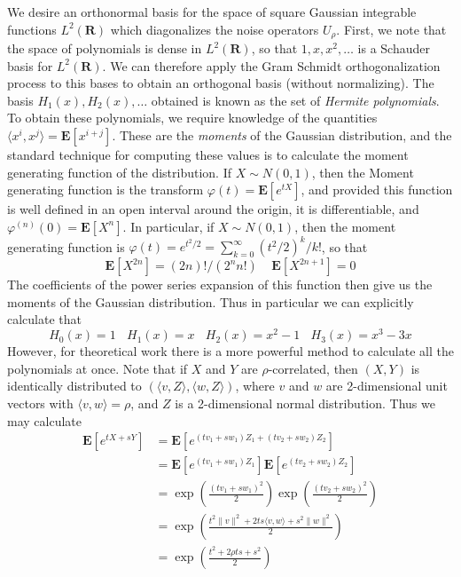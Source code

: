 We desire an orthonormal basis for the space of square Gaussian integrable functions $L^2(\mathbf{R})$ which diagonalizes the noise operators $U_\rho$. First, we note that the space of polynomials is dense in $L^2(\mathbf{R})$, so that $1, x, x^2, \dots$ is a Schauder basis for $L^2(\mathbf{R})$. We can therefore apply the Gram Schmidt orthogonalization process to this bases to obtain an orthogonal basis (without normalizing). The basis $H_1(x), H_2(x), \dots$ obtained is known as the set of \emph{Hermite polynomials}. To obtain these polynomials, we require knowledge of the quantities $\langle x^i, x^j \rangle = \mathbf{E}[x^{i+j}]$. These are the {\it moments} of the Gaussian distribution, and the standard technique for computing these values is to calculate the moment generating function of the distribution. If $X \sim N(0,1)$, then the Moment generating function is the transform $\varphi(t) = \mathbf{E}[e^{tX}]$, and provided this function is well defined in an open interval around the origin, it is differentiable, and $\varphi^{(n)}(0) = \mathbf{E}[X^n]$. In particular, if $X \sim N(0,1)$, then the moment generating function is $\varphi(t) = e^{t^2/2} = \sum_{k = 0}^\infty (t^2/2)^k/k!$, so that
%
\[ \mathbf{E}[X^{2n}] = (2n)!/(2^n n!) \ \ \ \ \ \mathbf{E}[X^{2n+1}] = 0 \]
%
The coefficients of the power series expansion of this function then give us the moments of the Gaussian distribution. Thus in particular we can explicitly calculate that
%
\[ H_0(x) = 1\ \ \ \ H_1(x) = x\ \ \ \ H_2(x) = x^2 - 1\ \ \ \ H_3(x) = x^3 - 3x \]
%
However, for theoretical work there is a more powerful method to calculate all the polynomials at once. Note that if $X$ and $Y$ are $\rho$-correlated, then $(X,Y)$ is identically distributed to $(\langle v, Z \rangle, \langle w, Z \rangle)$, where $v$ and $w$ are 2-dimensional unit vectors with $\langle v, w \rangle = \rho$, and $Z$ is a 2-dimensional normal distribution. Thus we may calculate
%
\begin{align*}
    \mathbf{E}[e^{tX + sY}] &= \mathbf{E}[e^{(tv_1 + sw_1) Z_1 + (tv_2 + sw_2) Z_2}]\\
    &= \mathbf{E}[e^{(tv_1 + sw_1) Z_1}] \mathbf{E}[e^{(tv_2 + sw_2) Z_2}]\\
    &= \exp \left( \frac{(tv_1 + sw_1)^2}{2} \right) \exp \left( \frac{(tv_2 + sw_2)^2}{2} \right)\\
    &= \exp \left( \frac{t^2 \| v \|^2 + 2ts \langle v, w \rangle + s^2 \| w \|^2}{2}  \right)\\
    &= \exp \left( \frac{t^2 + 2 \rho t s + s^2}{2} \right)
\end{align*}
